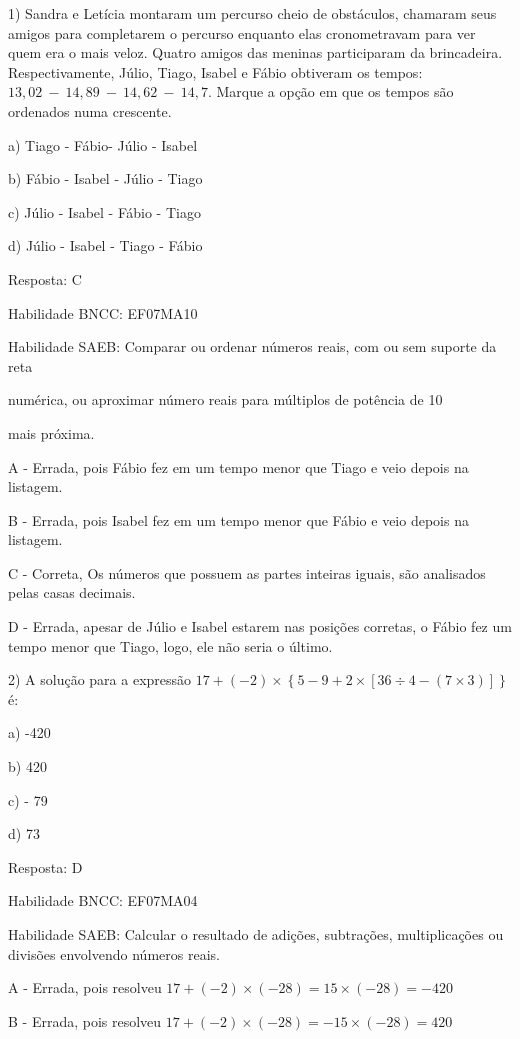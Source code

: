 1) Sandra e Letícia montaram um percurso cheio de obstáculos, chamaram
seus amigos para completarem o percurso enquanto elas cronometravam para
ver quem era o mais veloz. Quatro amigos das meninas participaram da
brincadeira. Respectivamente, Júlio, Tiago, Isabel e Fábio obtiveram os
tempos: \(13,02\  - \ 14,89\  - \ 14,62\  - \ 14,7\). Marque a opção em
que os tempos são ordenados numa crescente.~

a) Tiago - Fábio- Júlio - Isabel

b) Fábio - Isabel - Júlio - Tiago

c) Júlio - Isabel - Fábio - Tiago

d) Júlio - Isabel - Tiago - Fábio

Resposta: C

Habilidade BNCC: EF07MA10

Habilidade SAEB: Comparar ou ordenar números reais, com ou sem suporte
da reta

numérica, ou aproximar número reais para múltiplos de potência de 10

mais próxima.

A - Errada, pois Fábio fez em um tempo menor que Tiago e veio depois na
listagem.

B - Errada, pois Isabel fez em um tempo menor que Fábio e veio depois na
listagem.

C - Correta, Os números que possuem as partes inteiras iguais, são
analisados pelas casas decimais.

D - Errada, apesar de Júlio e Isabel estarem nas posições corretas, o
Fábio fez um tempo menor que Tiago, logo, ele não seria o último.

2) A solução para a expressão
\(17 + ( - 2) \times \left\{ 5 - 9 + 2 \times \left\lbrack 36 \div 4 - \left( 7 \times 3 \right) \right\rbrack \right\}\)
é:

a) -420

b) 420

c) - 79

d) 73

Resposta: D

Habilidade BNCC: EF07MA04

Habilidade SAEB: Calcular o resultado de adições, subtrações,
multiplicações ou divisões envolvendo números reais.

A - Errada, pois resolveu
\(17 + ( - 2) \times \left( - 28 \right) = 15 \times ( - 28) = - 420\ \)

B - Errada, pois resolveu
\(17 + ( - 2) \times \left( - 28 \right) = - 15 \times ( - 28) = 420\ \)

